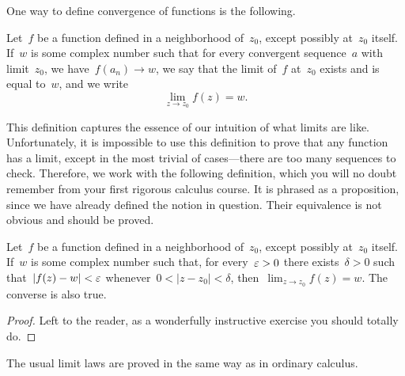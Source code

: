 \documentclass[twocolumn,12pt]{article}
\begin{document}
One way to define convergence of functions is the following.
\begin{definition}
  Let~$f$ be a function defined in a neighborhood of~$z_0$, except possibly at~$z_0$ itself. If~$w$ is some complex number such that for every convergent sequence~$a$ with limit~$z_0$, we have~$f(a_n) \to w$, we say that the limit of~$f$ at~$z_0$ exists and is equal to~$w$, and we write
  \[
    \lim_{z \to z_0} f(z) = w.
  \]
\end{definition}
This definition captures the essence of our intuition of what limits are like. Unfortunately, it is impossible to use this definition to prove that any function has a limit, except in the most trivial of cases---there are too many sequences to check. Therefore, we work with the following definition, which you will no doubt remember from your first rigorous calculus course. It is phrased as a proposition, since we have already defined the notion in question. Their equivalence is not obvious and should be proved.
\begin{proposition}
  Let~$f$ be a function defined in a neighborhood of~$z_0$, except possibly at~$z_0$ itself. If~$w$ is some complex number such that, for every~$\varepsilon > 0$ there exists~$\delta > 0$ such that~$|f(z) - w| < \varepsilon$ whenever~$0 < |z - z_0| < \delta$, then~$\lim_{z\to z_0} f(z) = w$. The converse is also true.
\end{proposition}
\begin{proof}
  Left to the reader, as a wonderfully instructive exercise you should totally do.
\end{proof}
The usual limit laws are proved in the same way as in ordinary calculus.
\end{document}
